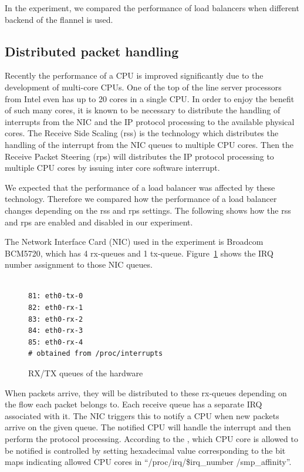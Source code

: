 In the experiment, we compared the performance of load balancers when different backend of the flannel is used. 

\subsection{Distributed packet handling}

Recently the performance of a CPU is improved significantly due to the development of multi-core CPUs.
One of the top of the line server processors from Intel even has up to 20 cores in a single CPU.
In order to enjoy the benefit of such many cores, 
it is known to be necessary to distribute the handling of interrupts from the NIC and the IP protocol processing
to the available physical cores.
The Receive Side Scaling (rss)\cite{TomHerbert} is the technology 
which distributes the handling of the interrupt from the NIC queues to multiple CPU cores.
Then the Receive Packet Steering (rps)\cite{TomHerbert} will distributes the IP protocol processing 
to multiple CPU cores by issuing inter core software interrupt.

We expected that the performance of a load balancer was affected  by these technology.
Therefore we compared how the performance of a load balancer changes depending on the rss and rps settings.
The following shows how the rss and rps are enabled and disabled in our experiment. 

The Network Interface Card (NIC) used in the experiment is Broadcom BCM5720, which has 4 rx-queues and 1 tx-queue.
Figure~\ref{fig:rx-queue} shows  the IRQ number assignment to those NIC queues.
 
\begin{figure}
\begin{minipage}{0.8\columnwidth}
\small
\begin{verbatim}

81: eth0-tx-0
82: eth0-rx-1
83: eth0-rx-2
84: eth0-rx-3
85: eth0-rx-4
# obtained from /proc/interrupts 

\end{verbatim}
\end{minipage}
\caption{RX/TX queues of the hardware}
\label{fig:rx-queue}
\end{figure}

When packets arrive, they will be distributed to these rx-queues depending on the flow each packet belongs to.
Each receive queue has a separate IRQ associated with it. The NIC triggers
this to notify a CPU when new packets arrive on the given queue.
The notified CPU will handle the interrupt and then perform the protocol processing. 
According to the \cite{TomHerbert}, which CPU core is allowed to be notified is controlled by setting 
hexadecimal value corresponding to the bit maps indicating allowed CPU cores in \enquote{/proc/irq/\$irq\_number /smp\_affinity}.

